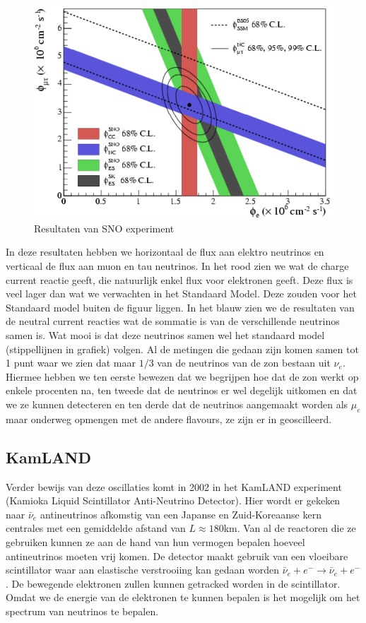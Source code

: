 \documentclass[../main.tex]{subfiles}
\begin{document}
\begin{figure}[h]
    \centering
    \includegraphics[width=0.5\linewidth]{neutrinos/sno_resultaten.png}
    \caption{Resultaten van SNO experiment}%
    \label{fig:neutrinos/sno_resultaten}
\end{figure}

In deze resultaten hebben we horizontaal de flux aan elektro neutrinos en verticaal de flux aan muon en tau neutrinos. In het rood zien we wat de charge current reactie geeft, die natuurlijk enkel flux voor elektronen geeft. Deze flux is veel lager dan wat we verwachten in het Standaard Model. Deze zouden voor het Standaard model buiten de figuur liggen. In het blauw zien we de resultaten van de neutral current reacties wat de sommatie is van de verschillende neutrinos samen is. Wat mooi is dat deze neutrinos samen wel het standaard model (stippellijnen in grafiek) volgen. Al de metingen die gedaan zijn komen samen tot 1 punt waar we zien dat maar $1/3$ van de neutrinos van de zon bestaan uit $\nu_e$.\\
Hiermee hebben we ten eerste bewezen dat we begrijpen hoe dat de zon werkt op enkele procenten na, ten tweede dat de neutrinos er wel degelijk uitkomen en dat we ze kunnen detecteren en ten derde dat de neutrinos aangemaakt worden als $\mu_e$ maar onderweg opmengen met de andere flavours, ze zijn er in geoscilleerd.

\subsection{KamLAND}%
\label{sub:kamland}

Verder bewijs van deze oscillaties komt in 2002 in het KamLAND experiment (Kamioka Liquid Scintillator Anti-Neutrino
Detector). Hier wordt er gekeken naar $\bar{\nu}_e$ antineutrinos afkomstig van een Japanse en Zuid-Koreaanse kern centrales met een gemiddelde afstand van $L\approx180$km. Van al de reactoren die ze gebruiken kunnen ze aan de hand van hun vermogen bepalen hoeveel antineutrinos moeten vrij komen. De detector maakt gebruik van een vloeibare scintillator waar aan elastische verstrooiing kan gedaan worden $\bar{\nu}_{e}+e^{-} \rightarrow \bar{\nu}_{e}+e^{-}$. De bewegende elektronen zullen kunnen getracked worden in de scintillator. Omdat we de energie van de elektronen te kunnen bepalen is het mogelijk om het spectrum van neutrinos te bepalen.
\end{document}
